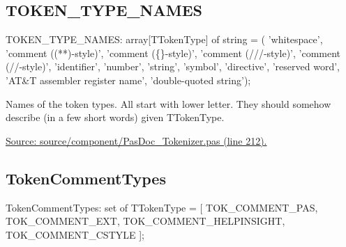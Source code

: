 \documentclass{report}
\newif\ifpdf
\begin{document}
\subsection*{TOKEN{\_}TYPE{\_}NAMES}
\fi
\label{PasDoc_Tokenizer-TOKEN_TYPE_NAMES}
\begin{list}{}{
\setlength{\itemindent}{0cm}
\setlength{\listparindent}{0cm}
\setlength{\leftmargin}{\evensidemargin}
\addtolength{\leftmargin}{\tmplength}
\settowidth{\labelsep}{X}
\addtolength{\leftmargin}{\labelsep}
\setlength{\labelwidth}{\tmplength}
}
\item[\textbf{Declaration}\hfill]
\ifpdf
\begin{flushleft}
\fi
\begin{ttfamily}
TOKEN{\_}TYPE{\_}NAMES: array[TTokenType] of string =
  ( 'whitespace', 'comment ((**)-style)', 'comment ({\{}{\}}-style)',
    'comment (///-style)',
    'comment (//-style)', 'identifier', 'number', 'string', 'symbol',
    'directive', 'reserved word', 'AT{\&}T assembler register name', 'double-quoted string');\end{ttfamily}

\ifpdf
\end{flushleft}
\fi

\par
\item[\textbf{Description}]
Names of the token types. All start with lower letter. They should somehow describe (in a few short words) given TTokenType.\par
\href{https://github.com/pasdoc/pasdoc/blob/master/source/component/PasDoc_Tokenizer.pas#L212}{Source: source/component/PasDoc{\_}Tokenizer.pas (line 212).}

\end{list}
\ifpdf
\subsection*{\large{\textbf{TokenCommentTypes}}\normalsize\hspace{1ex}\hrulefill}
\else
\subsection*{TokenCommentTypes}
\fi
\label{PasDoc_Tokenizer-TokenCommentTypes}
\begin{list}{}{
\setlength{\itemindent}{0cm}
\setlength{\listparindent}{0cm}
\setlength{\leftmargin}{\evensidemargin}
\addtolength{\leftmargin}{\tmplength}
\settowidth{\labelsep}{X}
\addtolength{\leftmargin}{\labelsep}
\setlength{\labelwidth}{\tmplength}
}
\item[\textbf{Declaration}\hfill]
\ifpdf
\begin{flushleft}
\fi
\begin{ttfamily}
TokenCommentTypes: set of TTokenType =
  [ TOK{\_}COMMENT{\_}PAS, TOK{\_}COMMENT{\_}EXT,
  TOK{\_}COMMENT{\_}HELPINSIGHT,
  TOK{\_}COMMENT{\_}CSTYLE ];\end{ttfamily}

\ifpdf
\end{flushleft}
\fi

\end{list}
\ifpdf
\end{document}
